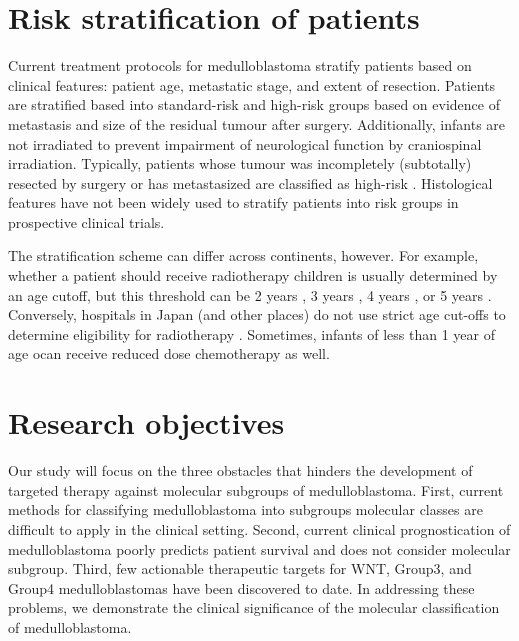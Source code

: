 %
%


\section{Risk stratification of patients}

Current treatment protocols for medulloblastoma stratify patients based on clinical features: patient age, metastatic stage, and extent of resection. Patients are stratified based into standard-risk and high-risk groups based on evidence of metastasis and size of the residual tumour after surgery. Additionally, infants are not irradiated to prevent impairment of neurological function by craniospinal irradiation. Typically, patients whose tumour was incompletely (subtotally) resected by surgery or has metastasized are classified as high-risk . Histological features have not been widely used to stratify patients into risk groups in prospective clinical trials.

The stratification scheme can differ across continents, however. For example, whether a patient should receive radiotherapy children is usually determined by an age cutoff, but this threshold can be 2 years , 3 years , 4 years , or 5 years . Conversely, hospitals in Japan (and other places) do not use strict age cut-offs to determine eligibility for radiotherapy  . Sometimes, infants of less than 1 year of age ocan receive reduced dose chemotherapy as well.


\section{Research objectives}

Our study will focus on the three obstacles that hinders the development of targeted therapy against molecular subgroups of medulloblastoma. First, current methods for classifying medulloblastoma into subgroups molecular classes are difficult to apply in the clinical setting. Second, current clinical prognostication of medulloblastoma poorly predicts patient survival and does not consider molecular subgroup. Third, few actionable therapeutic targets for WNT, Group3, and Group4 medulloblastomas have been discovered to date. In addressing these problems, we demonstrate the clinical significance of the molecular classification of medulloblastoma.

